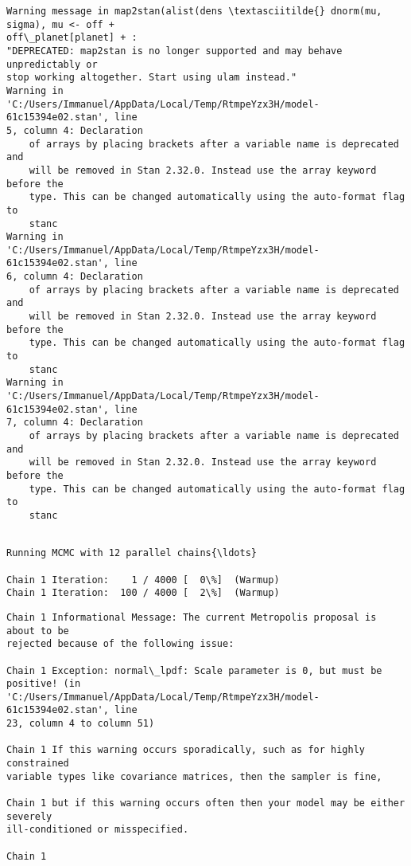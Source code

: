 \documentclass[11pt]{article}
\begin{document}
    \begin{Verbatim}[commandchars=\\\{\}]
Warning message in map2stan(alist(dens \textasciitilde{} dnorm(mu, sigma), mu <- off +
off\_planet[planet] + :
"DEPRECATED: map2stan is no longer supported and may behave unpredictably or
stop working altogether. Start using ulam instead."
Warning in
'C:/Users/Immanuel/AppData/Local/Temp/RtmpeYzx3H/model-61c15394e02.stan', line
5, column 4: Declaration
    of arrays by placing brackets after a variable name is deprecated and
    will be removed in Stan 2.32.0. Instead use the array keyword before the
    type. This can be changed automatically using the auto-format flag to
    stanc
Warning in
'C:/Users/Immanuel/AppData/Local/Temp/RtmpeYzx3H/model-61c15394e02.stan', line
6, column 4: Declaration
    of arrays by placing brackets after a variable name is deprecated and
    will be removed in Stan 2.32.0. Instead use the array keyword before the
    type. This can be changed automatically using the auto-format flag to
    stanc
Warning in
'C:/Users/Immanuel/AppData/Local/Temp/RtmpeYzx3H/model-61c15394e02.stan', line
7, column 4: Declaration
    of arrays by placing brackets after a variable name is deprecated and
    will be removed in Stan 2.32.0. Instead use the array keyword before the
    type. This can be changed automatically using the auto-format flag to
    stanc


    \end{Verbatim}

    \begin{Verbatim}[commandchars=\\\{\}]
Running MCMC with 12 parallel chains{\ldots}

Chain 1 Iteration:    1 / 4000 [  0\%]  (Warmup)
Chain 1 Iteration:  100 / 4000 [  2\%]  (Warmup)
    \end{Verbatim}

    \begin{Verbatim}[commandchars=\\\{\}]
Chain 1 Informational Message: The current Metropolis proposal is about to be
rejected because of the following issue:

Chain 1 Exception: normal\_lpdf: Scale parameter is 0, but must be positive! (in
'C:/Users/Immanuel/AppData/Local/Temp/RtmpeYzx3H/model-61c15394e02.stan', line
23, column 4 to column 51)

Chain 1 If this warning occurs sporadically, such as for highly constrained
variable types like covariance matrices, then the sampler is fine,

Chain 1 but if this warning occurs often then your model may be either severely
ill-conditioned or misspecified.

Chain 1

    \end{Verbatim}
\end{document}
